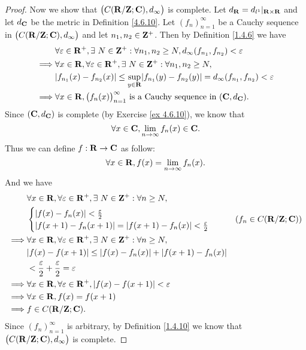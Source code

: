\begin{proof}
    Now we show that \(\big(C(\mathbf{R} / \mathbf{Z} ; \mathbf{C}), d_\infty\big)\) is complete.
    Let \(d_{\mathbf{R}} = d_{l^1}|_{\mathbf{R} \times \mathbf{R}}\) and let \(d_{\mathbf{C}}\) be the metric in Definition \ref{4.6.10}.
    Let \((f_n)_{n = 1}^\infty\) be a Cauchy sequence in \(\big(C(\mathbf{R} / \mathbf{Z} ; \mathbf{C}), d_\infty\big)\) and let \(n_1, n_2 \in \mathbf{Z}^+\).
    Then by Definition \ref{1.4.6} we have
    \begin{align*}
                 & \forall \varepsilon \in \R^+, \exists\ N \in \Z^+ : \forall n_1, n_2 \geq N, d_\infty(f_{n_1}, f_{n_2}) < \varepsilon       \\
        \implies & \forall x \in \R, \forall \varepsilon \in \R^+, \exists\ N \in \Z^+ : \forall n_1, n_2 \geq N,                              \\
                 & \abs{f_{n_1}(x) - f_{n_2}(x)} \leq \sup_{y \in \R} \abs{f_{n_1}(y) - f_{n_2}(y)} = d_\infty(f_{n_1}, f_{n_2}) < \varepsilon \\
        \implies & \forall x \in \R, \big(f_n(x)\big)_{n = 1}^\infty \text{ is a Cauchy sequence in } (\C, d_{\C}).
    \end{align*}
    Since \((\mathbf{C}, d_{\mathbf{C}})\) is complete (by Exercise \ref{ex 4.6.10}), we know that
    \[
        \forall x \in \mathbf{C}, \lim_{n \to \infty} f_n(x) \in \mathbf{C}.
    \]
    Thus we can define \(f : \mathbf{R} \to \mathbf{C}\) as follow:
    \[
        \forall x \in \mathbf{R}, f(x) = \lim_{n \to \infty} f_n(x).
    \]
    And we have
    \begin{align*}
                 & \forall x \in \R, \forall \varepsilon \in \R^+, \exists\ N \in \Z^+ : \forall n \geq N, \\
                 & \begin{cases}
                       \abs{f(x) - f_n(x)} < \frac{\varepsilon}{2} \\
                       \abs{f(x + 1) - f_n(x + 1)} = \abs{f(x + 1) - f_n(x)} < \frac{\varepsilon}{2}
                   \end{cases}           & (f_n \in C(\R / \Z ; \C))            \\
        \implies & \forall x \in \R, \forall \varepsilon \in \R^+, \exists\ N \in \Z^+ : \forall n \geq N, \\
                 & \abs{f(x) - f(x + 1)} \leq \abs{f(x) - f_n(x)} + \abs{f(x + 1) - f_n(x)}                \\
                 & < \frac{\varepsilon}{2} + \frac{\varepsilon}{2} = \varepsilon                           \\
        \implies & \forall x \in \R, \forall \varepsilon \in \R^+, \abs{f(x) - f(x + 1)} < \varepsilon     \\
        \implies & \forall x \in \R, f(x) = f(x + 1)                                                       \\
        \implies & f \in C(\R / \Z ; \C).
    \end{align*}
    Since \((f_n)_{n = 1}^\infty\) is arbitrary, by Definition \ref{1.4.10} we know that \(\big(C(\mathbf{R} / \mathbf{Z} ; \mathbf{C}), d_\infty\big)\) is complete.
\end{proof}